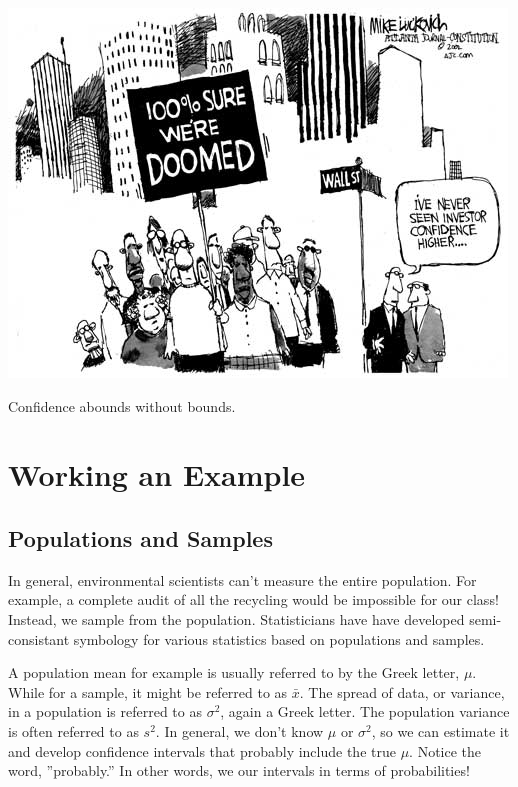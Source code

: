 \documentclass{tufte-handout}\usepackage[]{graphicx}\usepackage[]{color}
\begin{document}
\begin{marginfigure}
	\centering
		\includegraphics{Investor_confidence500.jpg}
	\caption{Confidence abounds without bounds.}
	\label{fig:Investor_confidence500}
\end{marginfigure}

\section{Working an Example}

\subsection{Populations and Samples}

In general, environmental scientists can't measure the entire population. For example, a complete audit of all the recycling would be impossible for our class!  Instead, we sample from the population. Statisticians have have developed semi-consistant symbology for various statistics based on populations and samples. 

A population mean for example is usually referred to by the Greek letter, $\mu$. While for a sample, it might be referred to as $\bar{x}$. The spread of data, or variance, in a population is referred to as $\sigma^2$, again a Greek letter. The population variance is often referred to as $s^2$. In general, we don't know $\mu$ or $\sigma^2$, so we can estimate it and develop confidence intervals that probably include the true $\mu$. Notice the word, ''probably.''  In other words, we our intervals in terms of probabilities!
\end{document}

